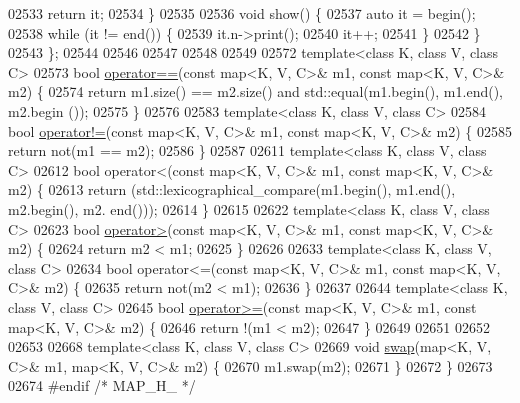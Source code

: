 \begin{DoxyCode}
02533         \textcolor{keywordflow}{return} it;
02534     \}
02535 
02536     \textcolor{keywordtype}{void} show() \{
02537         \textcolor{keyword}{auto} it = begin();
02538         \textcolor{keywordflow}{while} (it != end()) \{
02539             it.n->print();
02540             it++;
02541         \}
02542     \}
02543 \};
02544 
02546 
02547 
02548 
02549 
02572 \textcolor{keyword}{template}<\textcolor{keyword}{class} K, \textcolor{keyword}{class} V, \textcolor{keyword}{class} C>
02573 \textcolor{keywordtype}{bool} \hyperlink{classaed2_1_1map_abfc51b39670220e79037ac067006e933_abfc51b39670220e79037ac067006e933}{operator==}(\textcolor{keyword}{const} map<K, V, C>& m1, \textcolor{keyword}{const} map<K, V, C>& m2) \{
02574     \textcolor{keywordflow}{return} m1.size() == m2.size() and std::equal(m1.begin(), m1.end(), m2.begin
      ());
02575 \}
02576 
02583 \textcolor{keyword}{template}<\textcolor{keyword}{class} K, \textcolor{keyword}{class} V, \textcolor{keyword}{class} C>
02584 \textcolor{keywordtype}{bool} \hyperlink{classaed2_1_1map_abce0fa35c5b25fd67111c2e704616f09_abce0fa35c5b25fd67111c2e704616f09}{operator!=}(\textcolor{keyword}{const} map<K, V, C>& m1, \textcolor{keyword}{const} map<K, V, C>& m2) \{
02585     \textcolor{keywordflow}{return} not(m1 == m2);
02586 \}
02587 
02611 \textcolor{keyword}{template}<\textcolor{keyword}{class} K, \textcolor{keyword}{class} V, \textcolor{keyword}{class} C>
02612 \textcolor{keywordtype}{bool} operator<(const map<K, V, C>& m1, \textcolor{keyword}{const} map<K, V, C>& m2) \{
02613     \textcolor{keywordflow}{return} (std::lexicographical\_compare(m1.begin(), m1.end(), m2.begin(), m2.
      end()));
02614 \}
02615 
02622 \textcolor{keyword}{template}<\textcolor{keyword}{class} K, \textcolor{keyword}{class} V, \textcolor{keyword}{class} C>
02623 \textcolor{keywordtype}{bool} \hyperlink{classaed2_1_1map_a2000cd874b72034ce7fe730c811b6c63_a2000cd874b72034ce7fe730c811b6c63}{operator>}(\textcolor{keyword}{const} map<K, V, C>& m1, \textcolor{keyword}{const} map<K, V, C>& m2) \{
02624     \textcolor{keywordflow}{return} m2 < m1;
02625 \}
02626 
02633 \textcolor{keyword}{template}<\textcolor{keyword}{class} K, \textcolor{keyword}{class} V, \textcolor{keyword}{class} C>
02634 \textcolor{keywordtype}{bool} operator<=(const map<K, V, C>& m1, \textcolor{keyword}{const} map<K, V, C>& m2) \{
02635     \textcolor{keywordflow}{return} not(m2 < m1);
02636 \}
02637 
02644 \textcolor{keyword}{template}<\textcolor{keyword}{class} K, \textcolor{keyword}{class} V, \textcolor{keyword}{class} C>
02645 \textcolor{keywordtype}{bool} \hyperlink{classaed2_1_1map_a093a6d1a055339c5fc6297a1d47a9159_a093a6d1a055339c5fc6297a1d47a9159}{operator>=}(\textcolor{keyword}{const} map<K, V, C>& m1, \textcolor{keyword}{const} map<K, V, C>& m2) \{
02646     \textcolor{keywordflow}{return} !(m1 < m2);
02647 \}
02649 
02651 
02652 
02653 
02668 \textcolor{keyword}{template}<\textcolor{keyword}{class} K, \textcolor{keyword}{class} V, \textcolor{keyword}{class} C>
02669 \textcolor{keywordtype}{void} \hyperlink{classaed2_1_1map_a119cb2938bbc11c25ebd4fb824782a72_a119cb2938bbc11c25ebd4fb824782a72}{swap}(map<K, V, C>& m1, map<K, V, C>& m2) \{
02670     m1.swap(m2);
02671 \}
02672 \}
02673 
02674 \textcolor{preprocessor}{#endif }\textcolor{comment}{/* MAP\_H\_ */}
\end{DoxyCode}
